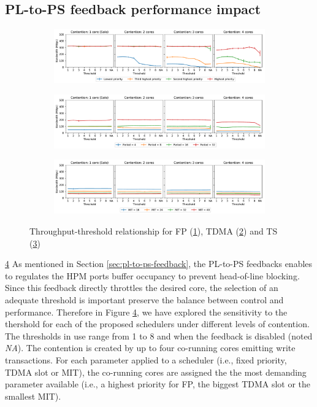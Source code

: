 \subsection{PL-to-PS feedback performance impact}
\begin{figure}[]
  \centering
  \begin{subfigure}{0.9\textwidth}
    \centering
    \includegraphics[scale=0.4]{images/fp.pdf}
    \caption{}
    \label{fig:threshold_fp}
  \end{subfigure}
  \hfill
  \begin{subfigure}{0.9\textwidth}
    \centering
    \includegraphics[scale=0.4]{images/tdma.pdf}
    \caption{}
    \label{fig:threshold_tdma}
  \end{subfigure}
  \hfill
  \begin{subfigure}{0.9\textwidth}
    \centering
    \includegraphics[scale=0.4]{images/ts.pdf}
    \caption{}
    \label{fig:threshold_ts}
  \end{subfigure}
  \caption{Throughput-threshold relationship for FP (\ref{fig:threshold_fp}), TDMA (\ref{fig:threshold_tdma}) and TS (\ref{fig:threshold_ts})}
  \label{fig:schim_threshold}
\end{figure}
\ref{fig:schim_threshold}
As mentioned in Section \ref{sec:pl-to-ps-feedback}, the PL-to-PS feedbacks enables
\schim to regulates the HPM ports buffer occupancy to prevent head-of-line blocking.
Since this feedback directly throttles the desired core, the selection of an adequate
threshold is important preserve the balance between control and performance.
Therefore in Figure \ref{fig:schim_threshold}, we have explored the sensitivity
to the thershold for each of the proposed schedulers under different levels of contention.
The thresholds in use range from 1 to 8 and when the feedback is disabled
(noted \emph{NA}). The contention is created by up to four co-running cores emitting
write transactions. For each parameter applied to a scheduler (i.e., fixed
priority, TDMA slot or MIT), the co-running cores are assigned the the most
demanding parameter available (i.e., a highest priority for FP, the biggest TDMA
slot or the smallest MIT).

